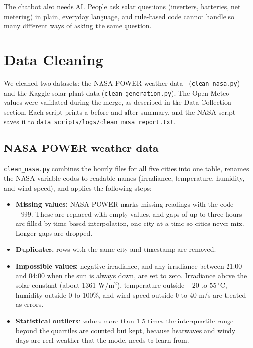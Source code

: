 \documentclass[11pt,a4paper]{article}
\begin{document}
The chatbot also needs AI. People ask solar questions (inverters, batteries,
net metering) in plain, everyday language, and rule-based code cannot handle
so many different ways of asking the same question.



\section{Data Cleaning}

We cleaned two datasets: the NASA POWER weather data~\cite{nasapower} (\texttt{clean\_nasa.py}) and the Kaggle solar plant data (\texttt{clean\_generation.py}). The Open-Meteo~\cite{openmeteo} values were validated during the merge, as described in the Data Collection section. Each script prints a before and after summary, and the NASA script saves it to \texttt{data\_scripts/logs/clean\_nasa\_report.txt}.
 
\subsection{NASA POWER weather data}
 
\texttt{clean\_nasa.py} combines the hourly files for all five cities into one table, renames the NASA variable codes to readable names (irradiance, temperature, humidity, and wind speed), and applies the following steps:
 
\begin{itemize}
    \item \textbf{Missing values:} NASA POWER marks missing readings with the code $-999$. These are replaced with empty values, and gaps of up to three hours are filled by time based interpolation, one city at a time so cities never mix. Longer gaps are dropped.
    \item \textbf{Duplicates:} rows with the same city and timestamp are removed.
    \item \textbf{Impossible values:} negative irradiance, and any irradiance between 21:00 and 04:00 when the sun is always down, are set to zero. Irradiance above the solar constant (about 1361 W/m$^2$), temperature outside $-20$ to $55\,^{\circ}$C, humidity outside 0 to 100\%, and wind speed outside 0 to 40 m/s are treated as errors.
    \item \textbf{Statistical outliers:} values more than 1.5 times the interquartile range beyond the quartiles are counted but kept, because heatwaves and windy days are real weather that the model needs to learn from.
\end{itemize}
 
\end{document}
